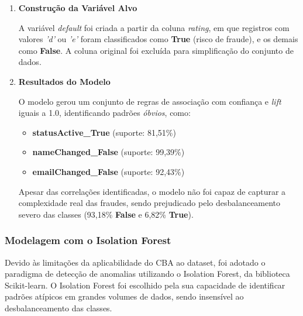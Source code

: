 \documentclass[12pt,a4paper]{article}
\begin{document}
\begin{enumerate}
    \item \textbf{Constru\c{c}\~{a}o da Vari\'avel Alvo}
    
    A vari\'avel \textit{default} foi criada a partir da coluna \textit{rating}, em que registros com valores \textit{'d'} ou \textit{'e'} foram classificados como \textbf{True} (risco de fraude), e os demais como \textbf{False}. A coluna original foi exclu\'ida para simplifica\c{c}\~{a}o do conjunto de dados.

    \item \textbf{Resultados do Modelo}
    
    O modelo gerou um conjunto de regras de associa\c{c}\~{a}o com confian\c{c}a e \textit{lift} iguais a 1.0, identificando padr\~{o}es \textit{\'obvios}, como:
    \begin{itemize}
        \item \textbf{statusActive\_True} (suporte: 81,51\%)
        \item \textbf{nameChanged\_False} (suporte: 99,39\%)
        \item \textbf{emailChanged\_False} (suporte: 92,43\%)
    \end{itemize}

    Apesar das correla\c{c}\~{o}es identificadas, o modelo n\~{a}o foi capaz de capturar a complexidade real das fraudes, sendo prejudicado pelo desbalanceamento severo das classes (93,18\% \textbf{False} e 6,82\% \textbf{True}).
\end{enumerate}


\subsubsection{Modelagem com o Isolation Forest}

Devido \`as limita\c{c}\~{o}es da aplicabilidade do CBA ao dataset, foi adotado o paradigma de detec\c{c}\~{a}o de anomalias utilizando o Isolation Forest, da biblioteca Scikit-learn. O Isolation Forest foi escolhido pela sua capacidade de identificar padr\~{o}es at\'ipicos em grandes volumes de dados, sendo insens\'ivel ao desbalanceamento das classes.
\end{document}
